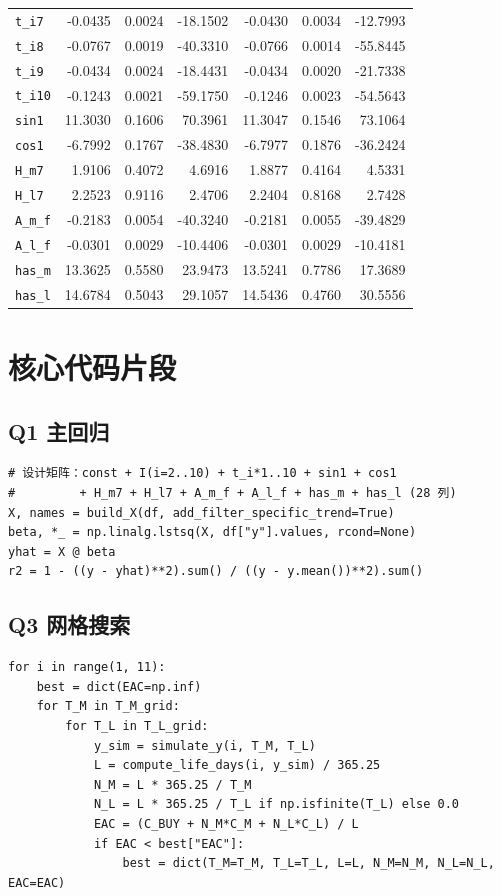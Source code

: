 \documentclass[12pt, a4paper, fontset=fandol]{ctexart}
\theoremstyle{definition}
\begin{document}
\begin{table}[H]
{\begin{tabular}{lrrrrrr}
\texttt{t\_i7} & -0.0435 & 0.0024 & -18.1502 & -0.0430 & 0.0034 & -12.7993 \\
\texttt{t\_i8} & -0.0767 & 0.0019 & -40.3310 & -0.0766 & 0.0014 & -55.8445 \\
\texttt{t\_i9} & -0.0434 & 0.0024 & -18.4431 & -0.0434 & 0.0020 & -21.7338 \\
\texttt{t\_i10} & -0.1243 & 0.0021 & -59.1750 & -0.1246 & 0.0023 & -54.5643 \\
\texttt{sin1} & 11.3030 & 0.1606 & 70.3961 & 11.3047 & 0.1546 & 73.1064 \\
\texttt{cos1} & -6.7992 & 0.1767 & -38.4830 & -6.7977 & 0.1876 & -36.2424 \\
\texttt{H\_m7} & 1.9106 & 0.4072 & 4.6916 & 1.8877 & 0.4164 & 4.5331 \\
\texttt{H\_l7} & 2.2523 & 0.9116 & 2.4706 & 2.2404 & 0.8168 & 2.7428 \\
\texttt{A\_m\_f} & -0.2183 & 0.0054 & -40.3240 & -0.2181 & 0.0055 & -39.4829 \\
\texttt{A\_l\_f} & -0.0301 & 0.0029 & -10.4406 & -0.0301 & 0.0029 & -10.4181 \\
\texttt{has\_m} & 13.3625 & 0.5580 & 23.9473 & 13.5241 & 0.7786 & 17.3689 \\
\texttt{has\_l} & 14.6784 & 0.5043 & 29.1057 & 14.5436 & 0.4760 & 30.5556 \\
\bottomrule
\end{tabular}%
}
\end{table}

\section{核心代码片段}

\subsection{Q1 主回归}
\begin{lstlisting}[caption={Q1 step6\_ols\_wls.py 主体}]
# 设计矩阵：const + I(i=2..10) + t_i*1..10 + sin1 + cos1
#         + H_m7 + H_l7 + A_m_f + A_l_f + has_m + has_l (28 列)
X, names = build_X(df, add_filter_specific_trend=True)
beta, *_ = np.linalg.lstsq(X, df["y"].values, rcond=None)
yhat = X @ beta
r2 = 1 - ((y - yhat)**2).sum() / ((y - y.mean())**2).sum()
\end{lstlisting}

\subsection{Q3 网格搜索}
\begin{lstlisting}[caption={Q3 step1\_grid\_search\_eac.py 主循环}]
for i in range(1, 11):
    best = dict(EAC=np.inf)
    for T_M in T_M_grid:
        for T_L in T_L_grid:
            y_sim = simulate_y(i, T_M, T_L)
            L = compute_life_days(i, y_sim) / 365.25
            N_M = L * 365.25 / T_M
            N_L = L * 365.25 / T_L if np.isfinite(T_L) else 0.0
            EAC = (C_BUY + N_M*C_M + N_L*C_L) / L
            if EAC < best["EAC"]:
                best = dict(T_M=T_M, T_L=T_L, L=L, N_M=N_M, N_L=N_L, EAC=EAC)
\end{lstlisting}
\end{document}
